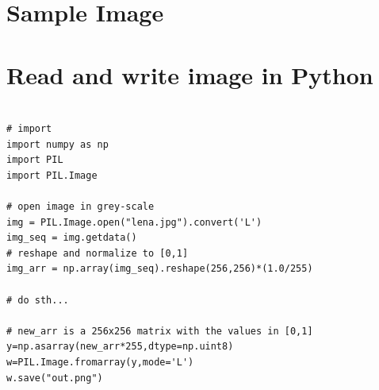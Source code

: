 \documentclass[10pt]{article}
\begin{document}
\newpage
\begin{appendices}

\section{Sample Image}\label{app:sample_img}

\begin{figure}[h]
   
\end{figure}



\section{Read and write image in Python}
\label{app:pil}

\begin{verbatim}

# import
import numpy as np
import PIL
import PIL.Image

# open image in grey-scale
img = PIL.Image.open("lena.jpg").convert('L')
img_seq = img.getdata()
# reshape and normalize to [0,1]
img_arr = np.array(img_seq).reshape(256,256)*(1.0/255)

# do sth...

# new_arr is a 256x256 matrix with the values in [0,1]
y=np.asarray(new_arr*255,dtype=np.uint8)
w=PIL.Image.fromarray(y,mode='L')
w.save("out.png")

\end{verbatim}


\end{appendices}
\end{document}
